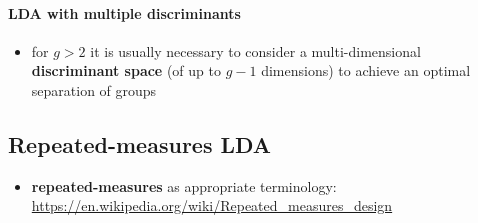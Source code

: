 \documentclass[a4paper]{article}
\begin{document}
\paragraph{LDA with multiple discriminants}

\begin{itemize}
\item for $g > 2$ it is usually necessary to consider a multi-dimensional \textbf{discriminant space} (of up to $g - 1$ dimensions) to achieve an optimal separation of groups
\end{itemize}



\subsection{Repeated-measures LDA}
\label{sec:lda:repeated}

\begin{itemize}
\item \textbf{repeated-measures} as appropriate terminology: \url{https://en.wikipedia.org/wiki/Repeated_measures_design}
\end{itemize}


\section{}
\label{sec:A}

\subsection{}
\label{sec:A:}


\section{}
\label{sec:B}

\subsection{}
\label{sec:B:}



  

\newpage
\listoftodos
\end{document}
